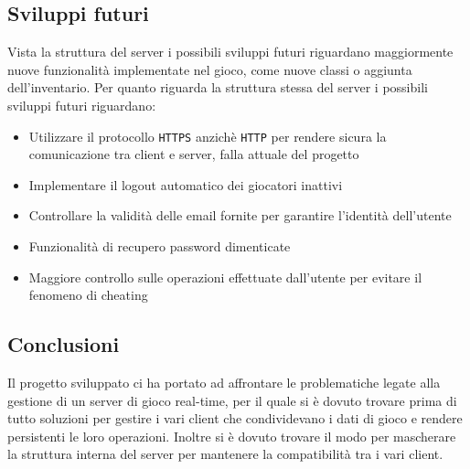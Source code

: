 \documentclass[12pt,a4]{article}
\begin{document}
\subsection{Sviluppi futuri}
Vista la struttura del server i possibili sviluppi futuri riguardano maggiormente nuove funzionalità implementate nel gioco, come nuove classi o aggiunta dell'inventario. Per quanto riguarda la struttura stessa del server i possibili sviluppi futuri riguardano:
\begin{itemize}
\item Utilizzare il protocollo \texttt{HTTPS} anzichè \texttt{HTTP} per rendere sicura la comunicazione tra client e server, falla attuale del progetto

\item Implementare il logout automatico dei giocatori inattivi
 
\item Controllare la validità delle email fornite per garantire l'identità dell'utente

\item Funzionalità di recupero password dimenticate

\item Maggiore controllo sulle operazioni effettuate dall'utente per evitare il fenomeno di cheating 
\end{itemize} 


\subsection{Conclusioni}
Il progetto sviluppato ci ha portato ad affrontare le problematiche legate alla gestione di un server di gioco real-time, per il quale si è dovuto trovare prima di tutto soluzioni per gestire i vari client che condividevano i dati di gioco e rendere persistenti le loro operazioni. Inoltre si è dovuto trovare il modo per mascherare la struttura interna del server per mantenere la compatibilità tra i vari client.
\end{document}
